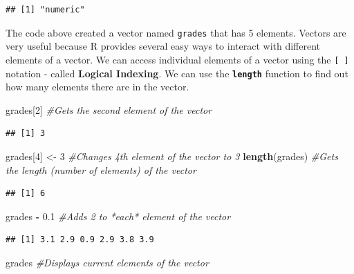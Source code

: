 \documentclass[]{krantz}
\makeatletter
\newenvironment{Shaded}{\begin{snugshade}}{\end{snugshade}}
\newcommand{\KeywordTok}[1]{\textcolor[rgb]{0.27,0.27,0.27}{\textbf{#1}}}
\newcommand{\DecValTok}[1]{\textcolor[rgb]{0.06,0.06,0.06}{#1}}
\newcommand{\FloatTok}[1]{\textcolor[rgb]{0.06,0.06,0.06}{#1}}
\newcommand{\StringTok}[1]{\textcolor[rgb]{0.5,0.5,0.5}{#1}}
\newcommand{\CommentTok}[1]{\textcolor[rgb]{0.56,0.35,0.01}{\textit{#1}}}
\newcommand{\OperatorTok}[1]{\textcolor[rgb]{0.81,0.36,0.00}{\textbf{#1}}}
\newcommand{\NormalTok}[1]{#1}
\newenvironment{kframe}{%
\medskip{}
\setlength{\fboxsep}{.8em}
 \def\at@end@of@kframe{}%
 \ifinner\ifhmode%
  \def\at@end@of@kframe{\end{minipage}}%
  \begin{minipage}{\columnwidth}%
 \fi\fi%
 \def\FrameCommand##1{\hskip\@totalleftmargin \hskip-\fboxsep
 \colorbox{shadecolor}{##1}\hskip-\fboxsep
     \hskip-\linewidth \hskip-\@totalleftmargin \hskip\columnwidth}%
 \MakeFramed {\advance\hsize-\width
   \@totalleftmargin\z@ \linewidth\hsize
   \@setminipage}}%
 {\par\unskip\endMakeFramed%
 \at@end@of@kframe}
\renewenvironment{Shaded}{\begin{kframe}}{\end{kframe}}
\theoremstyle{definition}
\theoremstyle{definition}
\theoremstyle{definition}
\theoremstyle{remark}
\makeatother
\begin{document}
\begin{verbatim}
## [1] "numeric"
\end{verbatim}

The code above created a vector named \texttt{grades} that has 5
elements. Vectors are very useful because R provides several easy ways
to interact with different elements of a vector. We can access
individual elements of a vector using the \texttt{{[}\ {]}} notation -
called \textbf{Logical Indexing}. We can use the
\textbf{\texttt{length}} function to find out how many elements there
are in the vector.

\begin{Shaded}
\begin{Highlighting}[]
\NormalTok{grades[}\DecValTok{2}\NormalTok{] }\CommentTok{#Gets the second element of the vector}
\end{Highlighting}
\end{Shaded}

\begin{verbatim}
## [1] 3
\end{verbatim}

\begin{Shaded}
\begin{Highlighting}[]
\NormalTok{grades[}\DecValTok{4}\NormalTok{] <-}\StringTok{ }\DecValTok{3} \CommentTok{#Changes 4th element of the vector to 3}
\KeywordTok{length}\NormalTok{(grades) }\CommentTok{#Gets the length (number of elements) of the vector}
\end{Highlighting}
\end{Shaded}

\begin{verbatim}
## [1] 6
\end{verbatim}

\begin{Shaded}
\begin{Highlighting}[]
\NormalTok{grades }\OperatorTok{-}\StringTok{ }\FloatTok{0.1} \CommentTok{#Adds 2 to *each* element of the vector }
\end{Highlighting}
\end{Shaded}

\begin{verbatim}
## [1] 3.1 2.9 0.9 2.9 3.8 3.9
\end{verbatim}

\begin{Shaded}
\begin{Highlighting}[]
\NormalTok{grades }\CommentTok{#Displays current elements of the vector}
\end{Highlighting}
\end{Shaded}
\end{document}

